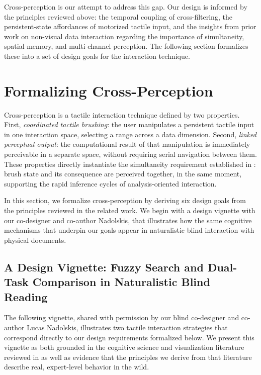 \documentclass[12pt]{cmuthesis}
\begin{document}
Cross-perception is our attempt to address this gap. Our design is informed by the principles reviewed above: the temporal coupling of cross-filtering, the persistent-state affordances of motorized tactile input, and the insights from prior work on non-visual data interaction regarding the importance of simultaneity, spatial memory, and multi-channel perception. The following section formalizes these into a set of design goals for the interaction technique.

\section{Formalizing Cross-Perception}
\label{sec:technique}

Cross-perception is a tactile interaction technique defined by two properties. First, \textit{coordinated tactile brushing}: the user manipulates a persistent tactile input in one interaction space, selecting a range across a data dimension. Second, \textit{linked perceptual output}: the computational result of that manipulation is immediately perceivable in a separate space, without requiring serial navigation between them. These properties directly instantiate the simultaneity requirement established in : brush state and its consequence are perceived together, in the same moment, supporting the rapid inference cycles of analysis-oriented interaction.

In this section, we formalize cross-perception by deriving six design goals from the principles reviewed in the related work. We begin with a design vignette with our co-designer and co-author Nadolskis, that illustrates how the same cognitive mechanisms that underpin our goals appear in naturalistic blind interaction with physical documents.



\subsection{A Design Vignette: Fuzzy Search and Dual-Task Comparison in Naturalistic Blind Reading} 
\label{sec:vignette}

The following vignette, shared with permission by our blind co-designer and co-author Lucas Nadolskis, illustrates two tactile interaction strategies that correspond directly to our design requirements formalized below. We present this vignette as both grounded in the cognitive science and visualization literature reviewed in  as well as evidence that the principles we derive from that literature describe real, expert-level behavior in the wild.
\end{document}
